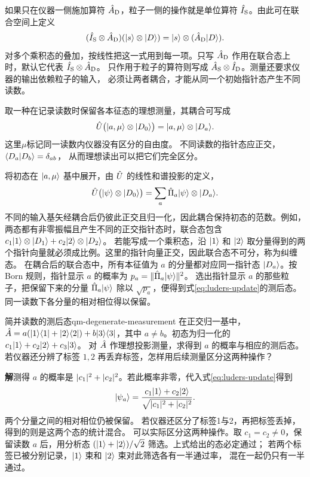 如果只在仪器一侧施加算符 $\hat{A}_{\mathrm{D}}$，粒子一侧的操作就是单位算符 $\hat{I}_{\mathrm{S}}$。由此可在联合空间上定义
\[
    (\hat{I}_{\mathrm{S}} \otimes \hat{A}_{\mathrm{D}})(\lvert s\rangle \otimes \lvert D\rangle) = \lvert s\rangle \otimes (\hat{A}_{\mathrm{D}}\lvert D\rangle).
\]
对多个乘积态的叠加，按线性把这一式用到每一项。只写 $\hat{A}_{\mathrm{D}}$ 作用在联合态上时，默认它代表 $\hat{I}_{\mathrm{S}} \otimes \hat{A}_{\mathrm{D}}$。
只作用于粒子的算符则写成 $\hat{A}_{\mathrm{S}} \otimes \hat{I}_{\mathrm{D}}$。测量还要求仪器的输出依赖粒子的输入，
必须让两者耦合，才能从同一个初始指针态产生不同读数。

取一种在记录读数时保留各本征态的理想测量，其耦合可写成
\begin{equation}
    \hat{U}\bigl(\lvert a,\mu\rangle \otimes \lvert D_0\rangle\bigr)
    = \lvert a,\mu\rangle \otimes \lvert D_a\rangle.
\end{equation}
这里$\mu$标记同一读数内仪器没有区分的自由度。
不同读数的指针态应正交，$\langle D_a\vert D_b\rangle = \delta_{ab}$，
从而理想读出可以把它们完全区分。

将初态在 $\lvert a,\mu\rangle$ 基中展开，由 $\hat{U}$ 的线性和谱投影的定义，
\begin{equation}
    \hat{U}\bigl(\lvert\psi\rangle \otimes \lvert D_0\rangle\bigr)
    = \sum_a \hat{\Pi}_a\lvert\psi\rangle \otimes \lvert D_a\rangle.
\end{equation}
不同的输入基矢经耦合后仍彼此正交且归一化，因此耦合保持初态的范数。例如，两态都有非零振幅且产生不同的正交指针态时，联合态包含
$c_1\lvert1\rangle \otimes \lvert D_1\rangle + c_2\lvert2\rangle \otimes \lvert D_2\rangle$。
若能写成一个乘积态，沿 $\lvert1\rangle$ 和 $\lvert2\rangle$ 取分量得到的两个指针向量就必须成比例。这里的指针向量正交，因此联合态不可分，称为纠缠态。
在耦合后的联合态中，所有本征值为 $a$ 的分量都对应同一指针态 $\lvert D_a\rangle$。按 Born 规则，指针显示 $a$ 的概率为 $p_a = \lVert\hat{\Pi}_a\lvert\psi\rangle\rVert^2$。
选出指针显示 $a$ 的那些粒子，把保留下来的分量 $\hat{\Pi}_a\lvert\psi\rangle$ 除以 $\sqrt{p_a}$，便得到式\eqref{eq:luders-update}的测后态。同一读数下各分量的相对相位得以保留。

\begin{example}{简并读数的测后态}{qm-degenerate-measurement}
    在正交归一基中，$\hat{A} = a(\lvert1\rangle\langle1\rvert + \lvert2\rangle\langle2\rvert) + b\lvert3\rangle\langle3\rvert$，其中 $a \ne b$。初态为归一化的 $c_1\lvert1\rangle + c_2\lvert2\rangle + c_3\lvert3\rangle$。
    对 $\hat{A}$ 作理想投影测量，求得到 $a$ 的概率与相应的测后态。若仪器还分辨了标签 $1,2$ 再丢弃标签，怎样用后续测量区分这两种操作？

    \par\smallskip\textbf{解}\quad 测得 $a$ 的概率是 $\lvert c_1\rvert^2 + \lvert c_2\rvert^2$。若此概率非零，代入式\eqref{eq:luders-update}得到
    \begin{equation}
        \lvert\psi_a\rangle =
        \frac{c_1\lvert1\rangle + c_2\lvert2\rangle}{\sqrt{\lvert c_1\rvert^2 + \lvert c_2\rvert^2}}.
    \end{equation}
    两个分量之间的相对相位仍被保留。
    若仪器还区分了标签1与2，再把标签丢掉，
    得到的则是这两个态的统计混合。
    可以实际区分这两种操作。取 $c_1 = c_2 \ne 0$，保留读数 $a$ 后，用分析态
    $(\lvert1\rangle + \lvert2\rangle)/\sqrt2$ 筛选。上式给出的态必定通过；
    若两个标签已被分别记录，$\lvert1\rangle$ 束和 $\lvert2\rangle$ 束对此筛选各有一半通过率，
    混在一起仍只有一半通过。
\end{example}

